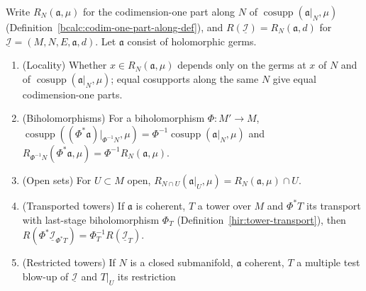 \begin{proposition}
\label{bcalc:codim-one-part-canonical}
\mixedleanok
Write \(R_N(\mathfrak a,\mu)\) for the codimension-one part along \(N\) of \(\operatorname{cosupp}(\mathfrak a|_N,\mu)\) (Definition~\ref{bcalc:codim-one-part-along-def}), and
\(R(\underline{\mathcal I})=R_N(\mathfrak a,d)\) for \(\underline{\mathcal I}=(M,N,E,\mathfrak a,d)\). Let \(\mathfrak a\) consist of holomorphic germs.
\begin{enumerate}
\item (Locality) Whether \(x\in R_N(\mathfrak a,\mu)\) depends only on the germs at \(x\) of \(N\) and of \(\operatorname{cosupp}(\mathfrak a|_N,\mu)\); equal cosupports along the
same \(N\) give equal codimension-one parts.
\item (Biholomorphisms) For a biholomorphism \(\Phi\colon M'\to M\), \(\operatorname{cosupp}((\Phi^*\mathfrak a)|_{\Phi^{-1}N},\mu)=\Phi^{-1}\operatorname{cosupp}(\mathfrak a|_N,\mu)\)
and \(R_{\Phi^{-1}N}(\Phi^*\mathfrak a,\mu)=\Phi^{-1}R_N(\mathfrak a,\mu)\).
\item (Open sets) For \(U\subset M\) open, \(R_{N\cap U}(\mathfrak a|_U,\mu)=R_N(\mathfrak a,\mu)\cap U\).
\item (Transported towers) If \(\mathfrak a\) is coherent, \(T\) a tower over \(M\) and \(\Phi^*T\) its transport with last-stage biholomorphism \(\Phi_T\)
(Definition~\ref{hir:tower-transport}), then \(R(\Phi^*\underline{\mathcal I}_{\Phi^*T})=\Phi_T^{-1}R(\underline{\mathcal I}_T)\).
\item (Restricted towers) If \(N\) is a closed submanifold, \(\mathfrak a\) coherent, \(T\) a multiple test blow-up of \(\underline{\mathcal I}\) and \(T|_U\) its restriction

\end{enumerate}
\end{proposition}
